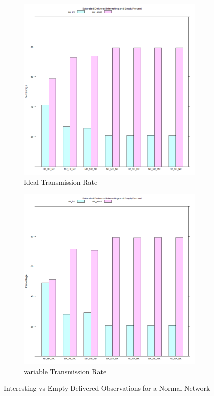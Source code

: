 \begin{figure}[H]
\centering
\begin{subfigure}{.5\textwidth}
  \centering
\includegraphics[width=\linewidth]{Chap7/figures/plots/saturated_ideal/emptvsint_percent.png}
  \caption{Ideal Transmission Rate}
	\label{fig:sim:res:sat:ideal:emptint}
\end{subfigure}%
\begin{subfigure}{.5\textwidth}
  \centering
\includegraphics[width=\linewidth]{Chap7/figures/plots/saturated_variable/emptvsint_percent.png}
  \caption{variable Transmission Rate}
	\label{fig:sim:res:sat:variable:emptint}
\end{subfigure}
\caption{Interesting vs Empty Delivered Observations for a Normal Network}
\end{figure}




